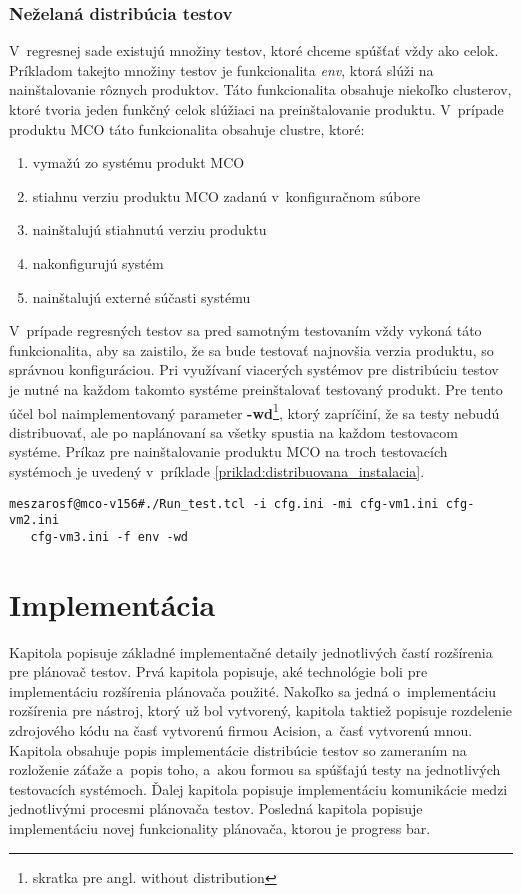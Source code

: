 \subsection*{Neželaná distribúcia testov}
V~regresnej sade existujú množiny testov, ktoré chceme spúšťať vždy ako celok.
Príkladom takejto množiny testov je funkcionalita \textit{env}, ktorá
slúži na nainštalovanie rôznych produktov. Táto funkcionalita obsahuje niekoľko clusterov,
ktoré tvoria jeden funkčný celok slúžiaci na preinštalovanie produktu.
V~prípade produktu MCO táto funkcionalita obsahuje clustre, ktoré:
\begin{enumerate}
\item vymažú zo systému produkt MCO
\item stiahnu verziu produktu MCO zadanú v~konfiguračnom súbore
\item nainštalujú stiahnutú verziu produktu
\item nakonfigurujú systém
\item nainštalujú externé súčasti systému
\end{enumerate} 

V~prípade regresných testov sa pred samotným testovaním vždy vykoná táto 
funkcionalita, aby sa zaistilo, že sa bude testovať najnovšia verzia produktu,
so správnou konfiguráciou.
Pri využívaní viacerých systémov pre distribúciu testov je nutné na každom
takomto systéme preinštalovať testovaný produkt. 
Pre tento účel bol naimplementovaný parameter 
\textbf{-wd}\footnote{skratka pre angl. without distribution}, 
ktorý zapríčiní, že sa testy nebudú distribuovať, ale po naplánovaní 
sa všetky spustia na každom testovacom systéme. 
Príkaz pre nainštalovanie produktu MCO na troch testovacích systémoch 
je uvedený v~príklade \ref{priklad:distribuovana_instalacia}.

\begin{lstlisting}[caption=Inštalácia produktu MCO na troch systémoch súčasne,
label=priklad:distribuovana_instalacia]
meszarosf@mco-v156#./Run_test.tcl -i cfg.ini -mi cfg-vm1.ini cfg-vm2.ini 
   cfg-vm3.ini -f env -wd
\end{lstlisting}


%
%
\chapter{Implementácia}
\label{kapitola:implementacia}
Kapitola popisuje základné implementačné detaily jednotlivých častí 
rozšírenia pre plánovač testov. Prvá kapitola popisuje, aké 
technológie boli pre implementáciu rozšírenia plánovača použité.
Nakoľko sa jedná o~implementáciu rozšírenia pre nástroj, ktorý už bol 
vytvorený, kapitola taktiež popisuje rozdelenie zdrojového kódu na časť 
vytvorenú firmou Acision, a~časť vytvorenú mnou.
Kapitola obsahuje popis implementácie distribúcie testov so zameraním na 
rozloženie záťaže a~popis toho, a~akou formou sa spúšťajú testy na jednotlivých 
testovacích systémoch. Ďalej kapitola popisuje implementáciu 
komunikácie medzi jednotlivými procesmi plánovača testov.
Posledná kapitola popisuje implementáciu 
novej funkcionality plánovača, ktorou je progress bar.

